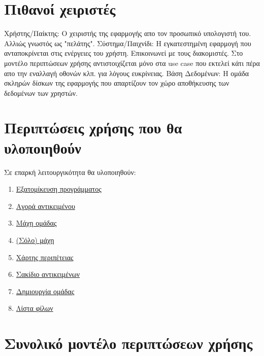 \section{Πιθανοί χειριστές}

Χρήστης/Παίκτης: Ο χειριστής της εφαρμογής απο τον προσωπικό υπολογιστή του. Αλλιώς γνωστός ως "πελάτης".
\newline
Σύστημα/Παιχνίδι: Η εγκατεστημένη εφαρμογή που ανταποκρίνεται στις ενέργειες του χρήστη. Επικοινωνεί με τους διακομιστές. Στο μοντέλο περιπτώσεων χρήσης αντιστοιχίζεται μόνο στα use case που εκτελεί κάτι πέρα απο την εναλλαγή οθονών κλπ. για λόγους ευκρίνειας.
\newline
Βάση Δεδομένων: Η ομάδα σκληρών δίσκων της εφαρμογής που απαρτίζουν τον χώρο αποθήκευσης των δεδομένων των χρηστών. 

\section{Περιπτώσεις χρήσης που θα υλοποιηθούν}
Σε επαρκή λειτουργικότητα θα υλοποιηθούν:
\begin{enumerate}
\item \hyperref[sec:profile]{Εξατομίκευση προγράμματος}
\item \hyperref[sec:buy]{Αγορά αντικειμένου}
\item \hyperref[sec:clanbattle]{Μάχη ομάδας}
\item \hyperref[sec:solo]{(Σόλο) μάχη}
\item \hyperref[sec:map]{Χάρτης περιπέτειας}
\item \hyperref[sec:backpack]{Σακίδιο αντικειμένων}
\item \hyperref[sec:createclan]{Δημιουργία ομάδας}
\item \hyperref[sec:friendslist]{Λίστα φίλων}
\end{enumerate}

\newpage
\section{Συνολικό μοντέλο περιπτώσεων χρήσης}

